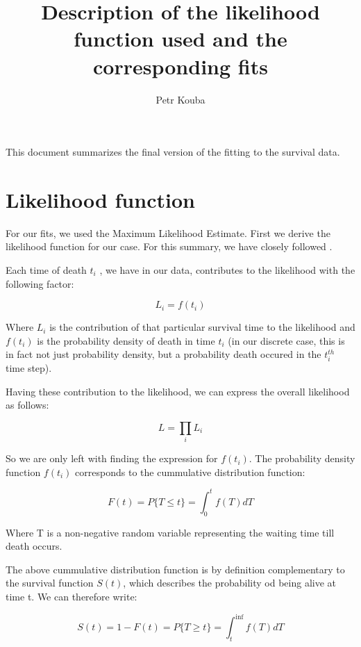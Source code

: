 \documentclass[10pt]{article}         %
\title{Description of the likelihood function used and the corresponding fits}
\author{Petr Kouba}
\begin{document}
\maketitle

This document summarizes the final version of the fitting to the survival data.

\newpage
\section{Likelihood function}

For our fits, we used the Maximum Likelihood Estimate. First we derive the likelihood function for our case. For this summary, we have closely followed \citep{likelihood}.

Each time of death $t_i$ , we have in our data, contributes to the likelihood with the following factor:

\begin{equation}
L_i = f(t_i)
\end{equation}

Where $L_i$ is the contribution of that particular survival time to the likelihood and $f(t_i)$ is the probability density of death in time $t_i$ (in our discrete case, this is in fact not just probability density, but a probability death occured in the $t_i^{th}$ time step).

Having these contribution to the likelihood, we can express the overall likelihood as follows:

\begin{equation}
L = \prod_i L_i
\end{equation}

So we are only left with finding the expression for $f(t_i)$. The probability density function  $f(t_i)$ corresponds to the cummulative distribution function:

\begin{equation}
F(t) = P\{T \leq t\} = \int_0^t{f(T)dT}
\end{equation}

Where T is a non-negative random variable representing the waiting time till death occurs.

The above cummulative distribution function is by definition complementary to the survival function $S(t)$, which describes the probability od being alive at time t. We can therefore write:

\begin{equation}
\label{survival_density}
S(t) = 1 - F(t) = P\{T \geq t\} = \int_t^{\inf}{f(T)dT}
\end{equation}
\end{document}
